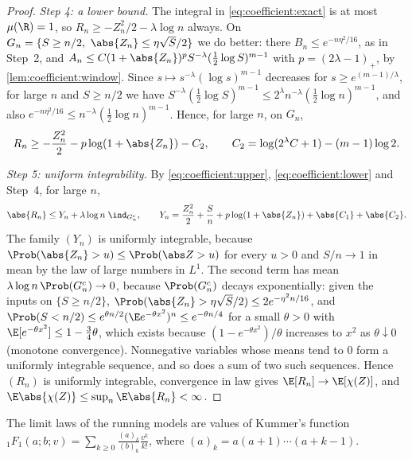\begin{refsection}
\begin{proof}
\emph{Step 4: a lower bound.} The integral in \eqref{eq:coefficient:exact} is at most $\mu(\R)=1$, so $R_n\ge-Z_n^2/2-\lambda\log n$ always. On $G_n=\{S\ge n/2,\ \abs{Z_n}\le\eta\sqrt S/2\}$ we do better: there $B_n\le e^{-n\eta^2/16}$, as in Step~2, and $A_n\le C(1+\abs{Z_n})^pS^{-\lambda}(\frac12\log S)^{m-1}$ with $p=(2\lambda-1)_+$, by \cref{lem:coefficient:window}. Since $s\mapsto s^{-\lambda}(\log s)^{m-1}$ decreases for $s\ge e^{(m-1)/\lambda}$, for large $n$ and $S\ge n/2$ we have $S^{-\lambda}(\frac12\log S)^{m-1}\le2^\lambda n^{-\lambda}(\frac12\log n)^{m-1}$, and also $e^{-n\eta^2/16}\le n^{-\lambda}(\frac12\log n)^{m-1}$. Hence, for large $n$, on $G_n$,
\begin{equation}\label{eq:coefficient:lower}
R_n\ge-\frac{Z_n^2}2-p\log(1+\abs{Z_n})-C_2,\qquad C_2=\log(2^\lambda C+1)-(m-1)\log2.
\end{equation}

\emph{Step 5: uniform integrability.} By \eqref{eq:coefficient:upper}, \eqref{eq:coefficient:lower} and Step~4, for large $n$,
\[
\abs{R_n}\le Y_n+\lambda\log n\;\ind_{G_n^c},\qquad Y_n=\frac{Z_n^2}2+\frac Sn+p\log(1+\abs{Z_n})+\abs{C_1}+\abs{C_2}.
\]
The family $(Y_n)$ is uniformly integrable, because $\Prob(\abs{Z_n}>u)\le\Prob(\abs Z>u)$ for every $u>0$ and $S/n\to1$ in mean by the law of large numbers in $L^1$. The second term has mean $\lambda\log n\,\Prob(G_n^c)\to0$, because $\Prob(G_n^c)$ decays exponentially: given the inputs on $\{S\ge n/2\}$, $\Prob(\abs{Z_n}>\eta\sqrt S/2)\le2e^{-\eta^2n/16}$, and $\Prob(S<n/2)\le e^{\theta n/2}(\E e^{-\theta x^2})^n\le e^{-\theta n/4}$ for a small $\theta>0$ with $\E[e^{-\theta x^2}]\le1-\frac34\theta$, which exists because $(1-e^{-\theta x^2})/\theta$ increases to $x^2$ as $\theta\downarrow0$ (monotone convergence). Nonnegative variables whose means tend to $0$ form a uniformly integrable sequence, and so does a sum of two such sequences. Hence $(R_n)$ is uniformly integrable, convergence in law gives $\E[R_n]\to\E[\chi(Z)]$, and $\E\abs{\chi(Z)}\le\sup_n\E\abs{R_n}<\infty$.
\end{proof}

The limit laws of the running models are values of Kummer's function ${}_1F_1(a;b;v)=\sum_{k\ge0}\frac{(a)_k}{(b)_k}\frac{v^k}{k!}$, where $(a)_k=a(a+1)\cdots(a+k-1)$.


\end{refsection}
